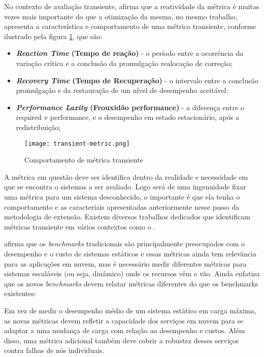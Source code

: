 No contexto de avaliação transiente, \cite{Rosu1997} afirma que a reatividade da métrica é muitas vezes mais importante do que a otimização da mesma, no mesmo trabalho, \cite{Rosu1997} apresenta a característica e comportamento de uma métrica transiente, conforme ilustrado pela figura \ref{fig:transient-metric}, que são: 
\begin{itemize}
	\item \textbf{\textit{Reaction Time} (Tempo de reação)} - o período entre a ocorrência da variação crítica e a conclusão da promulgação realocação de correção;
	
	\item \textbf{\textit{Recovery Time} (Tempo de Recuperação)}  - o intervalo entre a conclusão promulgação e da restauração de um nível de desempenho aceitável;
	
	\item \textbf{\textit{Performance Laxity} (Frouxidão performance)} - a diferença entre o required v performance, e o desempenho em estado estacionário, após a redistribuição;
\end{itemize}


\begin{figure}[!htb]
	\caption{Comportamento de métrica transiente}
	\label{fig:transient-metric}
	\centering
	\texttt{[image: transient-metric.png]}
\end{figure}


A métrica em questão deve ser identifica dentro da realidade e necessidade em que se encontra o sistemas a ser avaliado. Logo será de uma ingenuidade fixar uma métrica para um sistema desconhecido, o importante é que ela tenha o comportamento e as caracteriais apresentadas anteriormente nesse passo da metodologia de extensão. Existem diversos trabalhos dedicados que identificam métricas transiente em vários contextos como o \cite{Binnig2009, Lu2000, Rosu1997}.

\cite{Binnig2009} afirma que os \textit{benchmarks} tradicionais são principalmente preocupados com o desempenho e o custo de sistemas estáticos e essas métricas ainda tem relevância para as aplicações em nuvem, mas é necessário medir diferentes métricas para sistemas escaláveis (ou seja, dinâmico) onde os recursos vêm e vão. Ainda \cite{Binnig2009} enfatiza que os novos \textit{benchmarks} devem relatar métricas diferentes do que os benchmarks existentes: 
\begin{citacao}
Em vez de medir o desempenho médio de um sistema estático em carga máxima, as novas métricas devem refletir a capacidade dos serviços em nuvem para se adaptar a uma mudança de carga com relação ao desempenho e custos. Além disso, uma métrica adicional também deve cobrir a robustez desses serviços contra falhas de nós individuais.
\end{citacao}



